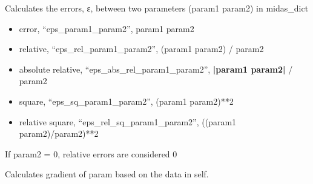 \documentclass[letterpaper,10pt,english]{sphinxmanual}
\begin{document}
\begin{fulllineitems}

\begin{fulllineitems}
\label{\detokenize{api/MARIGOLD.Condition:MARIGOLD.Condition.calc_errors}}
\pysigstartsignatures
{}
\pysigstopsignatures
\sphinxAtStartPar
Calculates the errors, ε, between two parameters (param1 \sphinxhyphen{} param2) in midas\_dict
\begin{description}
\begin{itemize}
\item {} 
\sphinxAtStartPar
error, “eps\_param1\_param2”, param1 \sphinxhyphen{} param2

\item {} 
\sphinxAtStartPar
relative, “eps\_rel\_param1\_param2”, (param1 \sphinxhyphen{} param2) / param2

\item {} 
\sphinxAtStartPar
absolute relative, “eps\_abs\_rel\_param1\_param2”, {\color{red}\bfseries{}|param1 \sphinxhyphen{} param2|} / param2

\item {} 
\sphinxAtStartPar
square, “eps\_sq\_param1\_param2”, (param1 \sphinxhyphen{} param2)**2

\item {} 
\sphinxAtStartPar
relative square, “eps\_rel\_sq\_param1\_param2”, ((param1 \sphinxhyphen{} param2)/param2)**2

\end{itemize}

\sphinxAtStartPar
If param2 = 0, relative errors are considered 0

\end{description}

\end{fulllineitems}


\begin{fulllineitems}
\label{\detokenize{api/MARIGOLD.Condition:MARIGOLD.Condition.calc_grad}}
\pysigstartsignatures
{}
\pysigstopsignatures
\sphinxAtStartPar
Calculates gradient of param based on the data in self.


\end{fulllineitems}
\end{fulllineitems}
\end{document}
